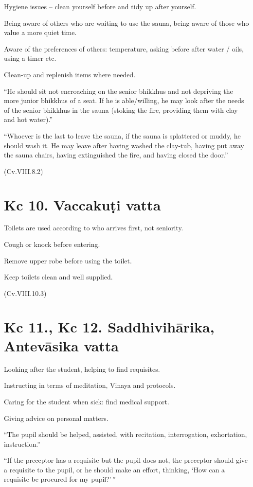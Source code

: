 Hygiene issues -- clean yourself before and tidy up after yourself.

Being aware of others who are waiting to use the sauna, being aware of
those who value a more quiet time.

Aware of the preferences of others: temperature, asking before after
water / oils, using a timer etc.

Clean-up and replenish items where needed.

``He should sit not encroaching on the senior bhikkhus and not depriving
the more junior bhikkhus of a seat. If he is able/willing, he may look
after the needs of the senior bhikkhus in the sauna (stoking the fire,
providing them with clay and hot water).''

``Whoever is the last to leave the sauna, if the sauna is splattered or
muddy, he should wash it. He may leave after having washed the clay-tub,
having put away the sauna chairs, having extinguished the fire, and
having closed the door.''

(Cv.VIII.8.2)

\section{Kc 10. Vaccakuṭi vatta}

Toilets are used according to who arrives first, not seniority.

Cough or knock before entering.

Remove upper robe before using the toilet.

Keep toilets clean and well supplied.

(Cv.VIII.10.3)

\section{Kc 11., Kc 12. Saddhivihārika, Antevāsika vatta}

Looking after the student, helping to find requisites.

Instructing in terms of meditation, Vinaya and protocols.

Caring for the student when sick: find medical support.

Giving advice on personal matters.

``The pupil should be helped, assisted, with recitation, interrogation,
exhortation, instruction.''

``If the preceptor has a requisite but the pupil does not, the preceptor
should give a requisite to the pupil, or he should make an effort,
thinking, `How can a requisite be procured for my pupil?'\,''

